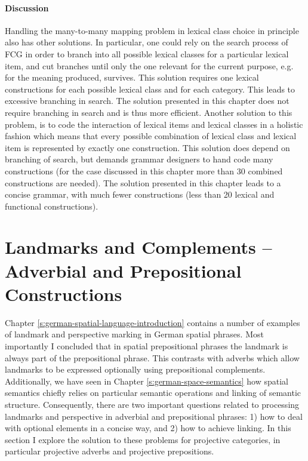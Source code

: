 \paragraph*{Discussion}
Handling the many-to-many mapping problem in lexical class choice
in principle also has other solutions. In particular, one could
rely on the search process of FCG in order to branch into all possible
lexical classes for a particular lexical item, and cut branches until only the 
one relevant for the current purpose, e.g. for the meaning produced, survives. 
This solution requires one lexical constructions for each possible lexical class
and for each category. This leads to excessive branching in search. 
The solution presented in this chapter does not require branching
in search and is thus more efficient. Another solution to this problem,
is to code the interaction of lexical items and lexical classes in a holistic
fashion which means that every possible combination of lexical class 
and lexical item is represented by exactly one construction. This 
solution does depend on branching of search, but demands grammar
designers to hand code many constructions (for the case discussed in
this chapter more than 30 combined constructions are needed). 
The solution presented in this chapter leads to a concise grammar,
with much fewer constructions (less than 20 lexical and functional constructions).


\section{Landmarks and Complements -- 
Adverbial and Prepositional Constructions}
\label{s:landmarks+complements}
Chapter \ref{s:german-spatial-language-introduction} contains a number of 
examples of landmark and perspective marking in German spatial 
phrases. Most importantly I concluded that in spatial prepositional phrases 
the landmark is always part of the prepositional phrase. This contrasts 
with adverbs which allow landmarks to be expressed optionally
using prepositional complements. Additionally, we have seen in Chapter 
\ref{s:german-space-semantics} how spatial semantics chiefly relies on particular 
semantic operations and linking of semantic structure. Consequently, 
there are two important questions related to processing landmarks and 
perspective in adverbial and prepositional phrases: 1) how to deal with 
optional elements in a concise way, and 2) how to achieve linking. 
In this section I explore the solution to these problems for projective categories, 
in particular projective adverbs and projective prepositions. 


